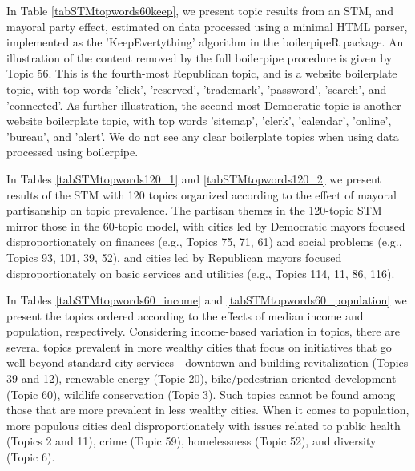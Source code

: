 \documentclass[11pt]{article}
\begin{document}
In Table \ref{tabSTMtopwords60keep}, we present topic results from an STM, and mayoral party effect, estimated on data processed using a minimal HTML parser, implemented as the 'KeepEvertything' algorithm in the boilerpipeR package. An illustration of the content removed by the full boilerpipe procedure is given by Topic 56. This is the fourth-most Republican topic, and is a website boilerplate topic, with top words 'click', 'reserved', 'trademark', 'password', 'search', and 'connected'.  As further illustration, the second-most Democratic topic is another website boilerplate topic, with top words 'sitemap', 'clerk', 'calendar', 'online', 'bureau', and 'alert'. We do not see any clear boilerplate topics when using data processed using boilerpipe.



In Tables \ref{tabSTMtopwords120_1} and \ref{tabSTMtopwords120_2} we present results of the STM with 120 topics organized according to the effect of mayoral partisanship on topic prevalence. The partisan themes in the 120-topic STM mirror those in the 60-topic model, with cities led by Democratic mayors focused disproportionately on finances (e.g., Topics 75, 71, 61) and social problems (e.g., Topics 93, 101, 39, 52), and cities led by Republican mayors focused disproportionately on basic services and utilities (e.g., Topics 114, 11,  86, 116).





In Tables \ref{tabSTMtopwords60_income} and \ref{tabSTMtopwords60_population} we present the topics ordered according to the effects of median income and population, respectively. Considering income-based variation in topics, there are several topics prevalent in more wealthy cities that focus on initiatives that go well-beyond standard city services---downtown and building revitalization (Topics 39 and 12), renewable energy (Topic 20), bike/pedestrian-oriented development (Topic 60), wildlife conservation (Topic 3). Such topics cannot be found among those that are more prevalent in less wealthy cities. When it comes to population, more populous cities deal disproportionately with issues related to public health (Topics  2 and 11), crime (Topic 59), homelessness (Topic 52), and diversity (Topic 6).




\end{document}
